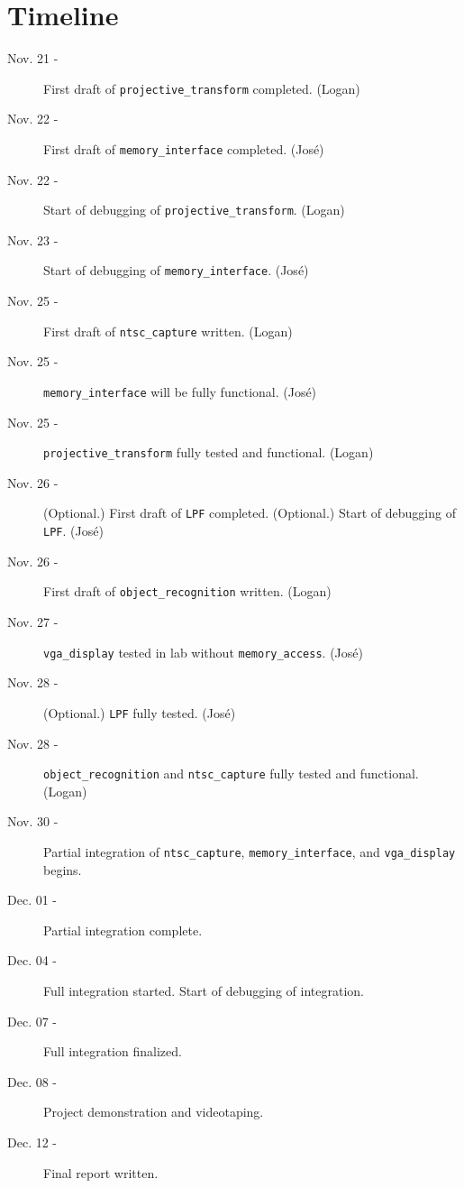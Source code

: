 \documentclass{article}
\begin{document}
\section{Timeline}
\begin{description}
\item[Nov. 21 -] First draft of {\tt projective\_transform} completed. (Logan)
\item[Nov. 22 -] First draft of {\tt memory\_interface} completed. (Jos\'{e})
\item[Nov. 22 -] Start of debugging of {\tt projective\_transform}. (Logan)
\item[Nov. 23 -] Start of debugging of {\tt memory\_interface}. (Jos\'{e})
\item[Nov. 25 -] First draft of {\tt ntsc\_capture} written. (Logan)
\item[Nov. 25 -] {\tt memory\_interface} will be fully functional. (Jos\'{e})
\item[Nov. 25 -] {\tt projective\_transform} fully tested and functional. (Logan)
\item[Nov. 26 -] (Optional.) First draft of {\tt LPF} completed. (Optional.) Start of debugging of {\tt LPF}. (Jos\'{e})
\item[Nov. 26 -] First draft of {\tt object\_recognition} written. (Logan)
\item[Nov. 27 -] {\tt vga\_display} tested in lab without {\tt memory\_access}. (Jos\'{e})
\item[Nov. 28 -] (Optional.) {\tt LPF} fully tested. (Jos\'{e})
\item[Nov. 28 -] {\tt object\_recognition} and {\tt ntsc\_capture} fully tested and functional. (Logan)
\item[Nov. 30 -] Partial integration of {\tt ntsc\_capture}, {\tt memory\_interface}, and {\tt vga\_display} begins.
\item[Dec. 01 -] Partial integration complete.
\item[Dec. 04 -] Full integration started. Start of debugging of integration.
\item[Dec. 07 -] Full integration finalized.
\item[Dec. 08 -] Project demonstration and videotaping.
\item[Dec. 12 -] Final report written.
\end{description}
\end{document}
